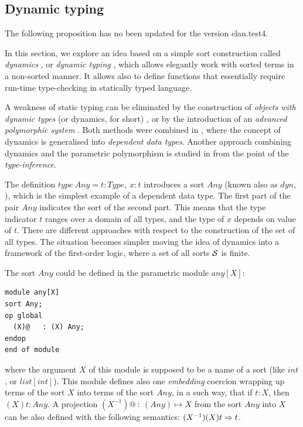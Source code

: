 \documentclass{article}
\begin{document}
\subsection{Dynamic typing}

The following proposition has no been updated for the version elan.test4.

{\scriptsize
In this section, we explore an idea based on a simple sort
construction called {\em dynamics} \cite{DYNA-ML}, or
{\em dynamic typing} \cite{DYNATYPING,DYNAMIC}, which allows
elegantly work with sorted terms in a non-sorted manner. 
It allows also to  define functions that essentially require
run-time type-checking in statically typed language.

A weakness of static typing can be eliminated by the
construction of {\em objects with dynamic types}
(or dynamics, for short) \cite{MODULA3}, or by the introduction 
of an {\em advanced polymorphic system} \cite{MilnerTofteHarper91}.
Both methods were combined in \cite{3LOGY}, where the concept
of dynamics is generalised into {\em dependent data types}.
Another approach combining dynamics and the parametric polymorphism
is studied in \cite{DYNA-ML} from the point of the {\em type-inference}.

The definition $type~Any = t:Type,~ x:t$ introduces a
sort $Any$ (known also as $dyn$, \cite{DYNA-ML,DYNATYPING}), 
which is the simplest example of a dependent data type.
The first part of the pair $Any$ indicates the sort of the
second part. 
This means that the type indicator $t$ ranges over a domain
of all types, and the type of $x$ depends on value of $t$.
There are different approaches with respect to the construction
of the set of all types.
The situation becomes simpler moving the idea of dynamics 
into a framework of the first-order logic, 
where a set of all sorts ${\cal S}$ is finite.

The sort $Any$ could be defined in the parametric module $any[X]$:
%
{\small
\begin{verbatim}
module any[X]
sort Any;
op global
  (X)@   : (X) Any;
endop
end of module
\end{verbatim}}\noindent
%
where the argument $X$ of this module is supposed to be a name of a sort
(like $int$, or $list[int]$). This module defines also one
{\em embedding} coercion wrapping up terms of the sort $X$ into terms of
the sort $Any$, in a such way, that if $t:X$, then $(X)t:Any$.
A projection $(X^{-1})@  ~:~ (Any) \mapsto X$ 
from the sort $Any$ into $X$ can be also defined  with the following 
semantics:
$(X^{-1})(X)t \rewrite t$.
 
}
\end{document}
